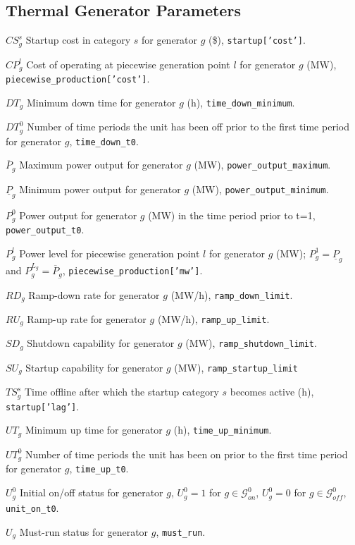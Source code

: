 \documentclass{article}
\newcommand{\cG}{{\mathcal G}}
\newcommand{\uP}{\underline{P}}
\newcommand{\oP}{\overline{P}}
\newcommand\mydescriptionopt{
	\IEEEsetlabelwidth{$g \in \cG_{\textit{off}}^0$]}
	\IEEEusemathlabelsep
}
\begin{document}
\subsection{Thermal Generator Parameters}
\begin{IEEEdescription}[\mydescriptionopt]
	\item[$CS_g^s$]  Startup cost in category $s$ for generator $g$ (\$), {\tt startup['cost']}.
	\item[$CP_g^l$]  Cost of operating at piecewise generation point $l$ for generator $g$ (MW), {\tt piecewise\_production['cost']}.
	\item[$DT_g$]    Minimum down time for generator $g$ (h), {\tt time\_down\_minimum}.
	\item[$DT^0_g$] Number of time periods the unit has been off prior to the first time period for generator $g$, {\tt time\_down\_t0}.
	\item[$\oP_g$]   Maximum power output for generator $g$ (MW), {\tt power\_output\_maximum}.
	\item[$\uP_g$]   Minimum power output for generator $g$ (MW), {\tt power\_output\_minimum}.
	\item[$P_g^0$]   Power output for generator $g$ (MW) in the time period prior to t=1, {\tt power\_output\_t0}.
	\item[$P_g^l$]   Power level for piecewise generation point $l$ for generator $g$ (MW); $P^1_g = \uP_g$ and $P^{L_g}_g = \oP_g$, {\tt piecewise\_production['mw']}.
	\item[$RD_g$]    Ramp-down rate for generator $g$ (MW/h), {\tt ramp\_down\_limit}.
	\item[$RU_g$]    Ramp-up rate for generator $g$ (MW/h), {\tt ramp\_up\_limit}.
	\item[$SD_g$]    Shutdown capability for generator $g$ (MW), {\tt ramp\_shutdown\_limit}.
	\item[$SU_g$]    Startup capability for generator $g$ (MW), {\tt ramp\_startup\_limit}
	\item[$TS^s_g$] Time offline after which the startup category $s$ becomes active (h), {\tt startup['lag']}.
	\item[$UT_g$]    Minimum up time for generator $g$ (h), {\tt time\_up\_minimum}.
	\item[$UT^0_g$] Number of time periods the unit has been on prior to the first time period for generator $g$, {\tt time\_up\_t0}.
	\item[$U_g^0$]  Initial on/off status for generator $g$, $U_g^0=1$ for $g \in \cG_{\textit{on}}^0$, $U_g^0=0$ for $g \in \cG_{\textit{off}}^0$,  {\tt unit\_on\_t0}.
	\item[$U_g$] 	Must-run status for generator $g$, {\tt must\_run}.
\end{IEEEdescription}
\end{document}
